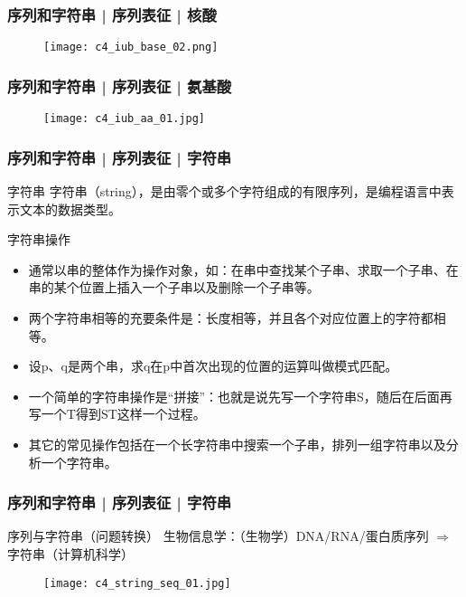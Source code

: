 \begin{frame}
  \frametitle{序列和字符串 | 序列表征 | 核酸}
  \begin{figure}
    \centering
    \texttt{[image: c4\_iub\_base\_02.png]}
  \end{figure}
\end{frame}

\begin{frame}
  \frametitle{序列和字符串 | 序列表征 | 氨基酸}
  \begin{figure}
    \centering
    \texttt{[image: c4\_iub\_aa\_01.jpg]}
  \end{figure}
\end{frame}

\begin{frame}
  \frametitle{序列和字符串 | 序列表征 | 字符串}
  \begin{block}{字符串}
    字符串（string），是由零个或多个字符组成的有限序列，是编程语言中表示文本的数据类型。
  \end{block}
  \pause
  \begin{block}{字符串操作}
    \begin{itemize}
      \item 通常以串的整体作为操作对象，如：在串中查找某个子串、求取一个子串、在串的某个位置上插入一个子串以及删除一个子串等。
      \item 两个字符串相等的充要条件是：长度相等，并且各个对应位置上的字符都相等。
      \item 设p、q是两个串，求q在p中首次出现的位置的运算叫做模式匹配。
      \item 一个简单的字符串操作是“拼接”：也就是说先写一个字符串S，随后在后面再写一个T得到ST这样一个过程。
      \item 其它的常见操作包括在一个长字符串中搜索一个子串，排列一组字符串以及分析一个字符串。
    \end{itemize}
  \end{block}
\end{frame}

\begin{frame}
  \frametitle{序列和字符串 | 序列表征 | 字符串}
  \begin{block}{序列与字符串\alert{（问题转换）}}
    生物信息学：（生物学）DNA/RNA/蛋白质序列 $\Longrightarrow$ 字符串（计算机科学）
  \end{block}
  \begin{figure}
    \centering
    \texttt{[image: c4\_string\_seq\_01.jpg]}
  \end{figure}
\end{frame}

